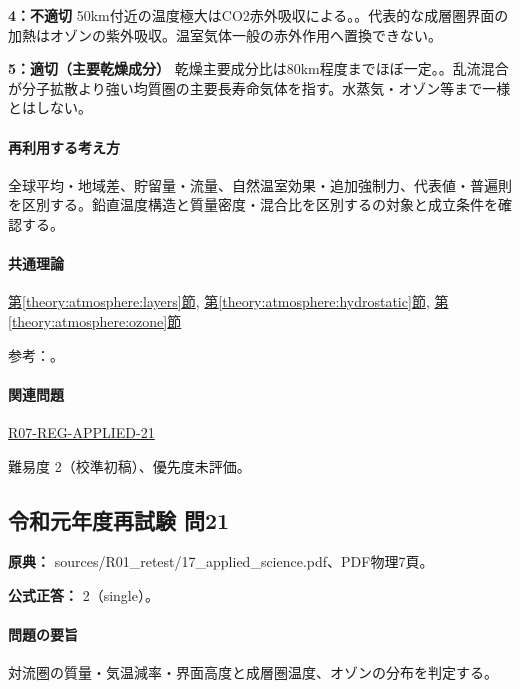 \noindent\textbf{4：不適切} 50km付近の温度極大はCO2赤外吸収による。。代表的な成層圏界面の加熱はオゾンの紫外吸収。温室気体一般の赤外作用へ置換できない。\par

\noindent\textbf{5：適切（主要乾燥成分）} 乾燥主要成分比は80km程度までほぼ一定。。乱流混合が分子拡散より強い均質圏の主要長寿命気体を指す。水蒸気・オゾン等まで一様とはしない。\par

\paragraph{再利用する考え方} 全球平均・地域差、貯留量・流量、自然温室効果・追加強制力、代表値・普遍則を区別する。鉛直温度構造と質量密度・混合比を区別するの対象と成立条件を確認する。

\paragraph{共通理論} \hyperref[theory:atmosphere:layers]{第\ref*{theory:atmosphere:layers}節}, \hyperref[theory:atmosphere:hydrostatic]{第\ref*{theory:atmosphere:hydrostatic}節}, \hyperref[theory:atmosphere:ozone]{第\ref*{theory:atmosphere:ozone}節}

\par 参考：\cite{atm_noaa_layers,atm_us1976,atm_jma_ozone}。

\paragraph{関連問題} \hyperref[q:r07-reg-applied-21]{R07-REG-APPLIED-21}

\par 難易度 2（校準初稿）、優先度未評価。

\subsection{令和元年度再試験 問21}
\label{q:r01-ret-applied-21}

\noindent\textbf{原典：} sources/R01\_retest/17\_applied\_science.pdf、PDF物理7頁。

\textbf{公式正答：} 2（single）。

\paragraph{問題の要旨} 対流圏の質量・気温減率・界面高度と成層圏温度、オゾンの分布を判定する。

